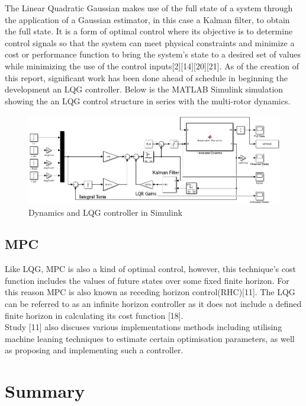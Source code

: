 \documentclass[12pt,a4paper,twoside]{report}
\begin{document}
				The Linear Quadratic Gaussian makes use of the full state of a system through the application of a Gaussian estimator, in this case a Kalman filter, to obtain the full state. It is a form of optimal control where its objective is to determine control signals so that the system can meet physical constraints and minimize a cost or performance function to bring the system’s state to a desired set of values while minimizing the use of the control inputs[2][14][20][21]. As of the creation of this report, significant work has been done ahead of schedule in beginning the development an LQG controller. Below is the MATLAB Simulink simulation showing the an LQG control structure in series with the multi-rotor dynamics.
				
				\begin{figure}[h!]
					\includegraphics[width=\linewidth]{LQGsim.png}
					\caption{Dynamics and LQG controller in Simulink}
					\label{fig:LQGsim}
				\end{figure} 
			
			\subsection*{MPC}
				Like LQG, MPC is also a kind of optimal control, however, this technique's cost function includes the values of future states over some fixed finite horizon. For this reason MPC is also known as receding horizon control(RHC)[11]. The LQG can be referred to as an infinite horizon controller as it does not include a defined finite horizon in calculating its cost function [18].
				\\
				Study [11] also discuses various implementations methods including utilising machine leaning techniques to estimate certain optimisation parameters, as well as proposing and implementing such a controller.
		
		\section*{Summary}
		
\end{document}
